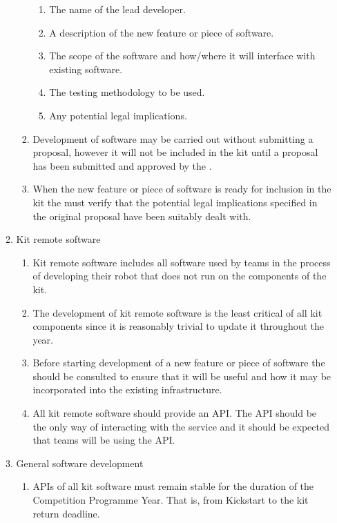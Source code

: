\begin{enumerate}
\begin{enumerate}
\begin{enumerate}
          \begin{enumerate}
            \item The name of the lead developer.
            \item A description of the new feature or piece of software.
            \item The scope of the software and how/where it will interface with existing software.
            \item The testing methodology to be used.
            \item Any potential legal implications.
          \end{enumerate}
        \item Development of software may be carried out without submitting a proposal, however it will not be included in the kit until a proposal has been submitted and approved by the .
        \item When the new feature or piece of software is ready for inclusion in the kit the  must verify that the potential legal implications specified in the original proposal have been suitably dealt with.
      \end{enumerate}
    \item Kit remote software
      \begin{enumerate}
        \item Kit remote software includes all software used by teams in the process of developing their robot that does not run on the components of the kit.
        \item The development of kit remote software is the least critical of all kit components since it is reasonably trivial to update it throughout the year.
        \item Before starting development of a new feature or piece of software the  should be consulted to ensure that it will be useful and how it may be incorporated into the existing infrastructure.
        \item All kit remote software should provide an API. The API should be the only way of interacting with the service and it should be expected that teams will be using the API.
      \end{enumerate}
    \item General software development
      \begin{enumerate}
        \item APIs of all kit software must remain stable for the duration of the Competition Programme Year. That is, from Kickstart to the kit return deadline.

\end{enumerate}
\end{enumerate}
\end{enumerate}
